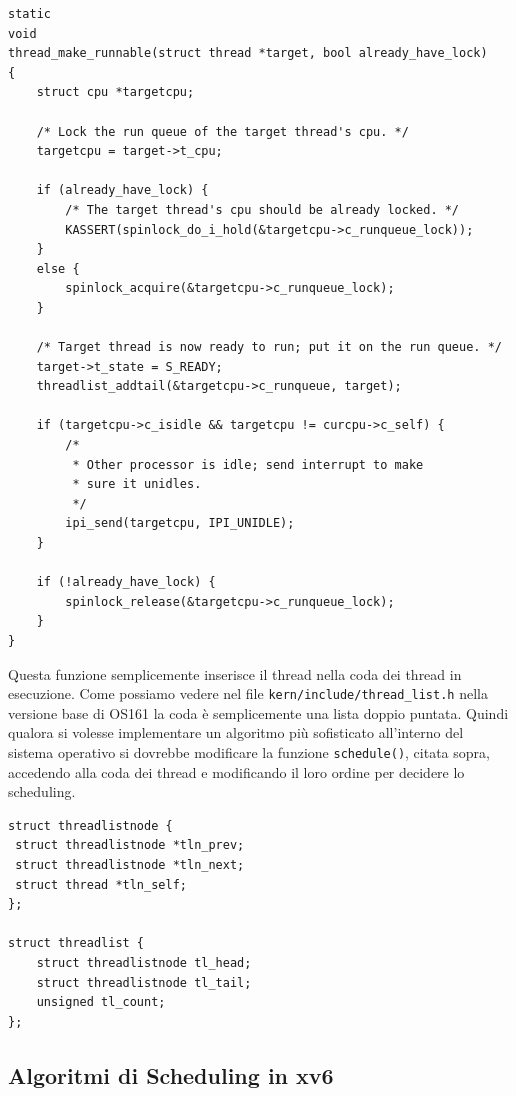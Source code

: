 \begin{lstlisting}[caption={La funzione \lstinline{thread_make_runnable} in \lstinline{kern/thread/thread.c}}]
static
void
thread_make_runnable(struct thread *target, bool already_have_lock)
{
	struct cpu *targetcpu;

	/* Lock the run queue of the target thread's cpu. */
	targetcpu = target->t_cpu;

	if (already_have_lock) {
		/* The target thread's cpu should be already locked. */
		KASSERT(spinlock_do_i_hold(&targetcpu->c_runqueue_lock));
	}
	else {
		spinlock_acquire(&targetcpu->c_runqueue_lock);
	}

	/* Target thread is now ready to run; put it on the run queue. */
	target->t_state = S_READY;
	threadlist_addtail(&targetcpu->c_runqueue, target);

	if (targetcpu->c_isidle && targetcpu != curcpu->c_self) {
		/*
		 * Other processor is idle; send interrupt to make
		 * sure it unidles.
		 */
		ipi_send(targetcpu, IPI_UNIDLE);
	}

	if (!already_have_lock) {
		spinlock_release(&targetcpu->c_runqueue_lock);
	}
}
\end{lstlisting}

Questa funzione semplicemente inserisce il thread nella coda dei thread in esecuzione. Come possiamo vedere nel file \lstinline{kern/include/thread_list.h} nella versione base di OS161 la coda è semplicemente una lista doppio puntata. Quindi qualora si volesse implementare un algoritmo più sofisticato all'interno del sistema operativo si dovrebbe modificare la funzione \lstinline{schedule()}, citata sopra, accedendo alla coda dei thread e modificando il loro ordine per decidere lo scheduling.

\begin{lstlisting}[caption={Struttura dati della coda dei thread in esecuzione}]
struct threadlistnode {
 struct threadlistnode *tln_prev;
 struct threadlistnode *tln_next;
 struct thread *tln_self;
};

struct threadlist {
	struct threadlistnode tl_head;
	struct threadlistnode tl_tail;
	unsigned tl_count;
};
\end{lstlisting}

\subsection{Algoritmi di Scheduling in xv6}